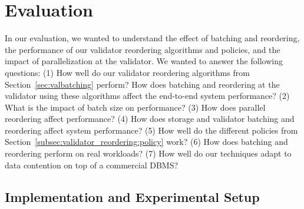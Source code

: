 \section{Evaluation}\label{sec:experiments}
In our evaluation, we wanted to understand the effect of batching and reordering, the performance of our validator reordering algorithms and policies, and the impact of parallelization at the validator.
We wanted to answer the following questions:
(1) How well do our validator reordering algorithms from Section~\ref{sec:valbatching} perform? How does batching and reordering at the validator using these algorithms affect the end-to-end system performance?
(2) What is the impact of batch size on performance? 
(3) How does parallel reordering affect performance?
(4) How does storage and validator batching and reordering
  affect system performance?
(5) How well do the different policies from Section~\ref{subsec:validator_reordering:policy} work?
(6) How does batching and reordering perform on real workloads?
(7) How well do our techniques adapt to data contention on top of a commercial DBMS?


\subsection{Implementation and Experimental Setup}
\label{subsec:experiment:implementation}

